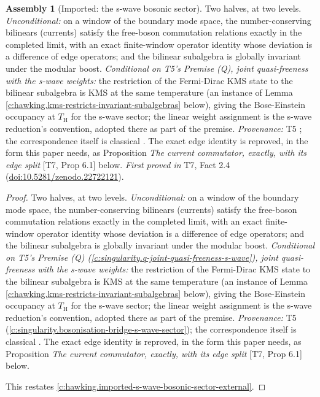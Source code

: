 \documentclass[11pt]{article}
\theoremstyle{definition}
\newtheorem{assembled}[theorem]{Assembly}
\theoremstyle{plain}
\providecommand{\TH}{}\renewcommand{\TH}{T_{\mathrm{H}}}
\begin{document}
\begin{assembled}[Imported: the s-wave bosonic sector]\label{c:hawking.imported-s-wave-bosonic-sector}
Two halves, at two levels. \emph{Unconditional:} on a window of the boundary mode space, the number-conserving bilinears (currents) satisfy the free-boson commutation relations exactly in the completed limit, with an exact finite-window operator identity whose deviation is a difference of edge operators; and the bilinear subalgebra is globally invariant under the modular boost. \emph{Conditional on T5's Premise (Q), joint quasi-freeness with the s-wave weights:} the restriction of the Fermi-Dirac KMS state to the bilinear subalgebra is KMS at the same temperature (an instance of Lemma \ref{c:hawking.kms-restricts-invariant-subalgebras} below), giving the Bose-Einstein occupancy at $\TH$ for the s-wave sector; the linear weight assignment is the s-wave reduction's convention, adopted there as part of the premise. \emph{Provenance:} T5 \cite[Prem.~8.1, Thm.~8.2]{ButlerT5}; the correspondence itself is classical \cite{FrenkelKac1980}. The exact edge identity is reproved, in the form this paper needs, as Proposition \emph{The current commutator, exactly, with its edge split} [T7, Prop 6.1] below.
\emph{First proved in} T7, Fact 2.4 (\href{https://doi.org/10.5281/zenodo.22722121}{doi:10.5281/zenodo.22722121}).
\end{assembled}
\begin{proof}
Two halves, at two levels. \emph{Unconditional:} on a window of the boundary mode space, the number-conserving bilinears (currents) satisfy the free-boson commutation relations exactly in the completed limit, with an exact finite-window operator identity whose deviation is a difference of edge operators; and the bilinear subalgebra is globally invariant under the modular boost. \emph{Conditional on T5's Premise (Q) (\ref{c:singularity.q-joint-quasi-freeness-s-wave}), joint quasi-freeness with the s-wave weights:} the restriction of the Fermi-Dirac KMS state to the bilinear subalgebra is KMS at the same temperature (an instance of Lemma \ref{c:hawking.kms-restricts-invariant-subalgebras} below), giving the Bose-Einstein occupancy at $\TH$ for the s-wave sector; the linear weight assignment is the s-wave reduction's convention, adopted there as part of the premise. \emph{Provenance:} T5 \cite[Prem.~8.1, Thm.~8.2]{ButlerT5} (\ref{c:singularity.bosonisation-bridge-s-wave-sector}); the correspondence itself is classical \cite{FrenkelKac1980}. The exact edge identity is reproved, in the form this paper needs, as Proposition \emph{The current commutator, exactly, with its edge split} [T7, Prop 6.1] below.

This restates \ref{c:hawking.imported-s-wave-bosonic-sector-external}.

\end{proof}
\end{document}
